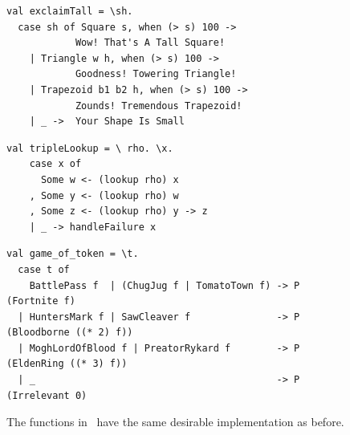\documentclass[article,screen,12pt, nonacm]{acmart}
\begin{document}
    \begin{figure}[ht] 
      \begin{minipage}[h]{0.54\linewidth}
        \pplst 
        \begin{lstlisting}[numbers=none, basicstyle=\tiny, xleftmargin=.2em,
          showstringspaces=false,
          frame=single]
val exclaimTall = \sh.
  case sh of Square s, when (> s) 100 -> 
            Wow! That's A Tall Square!  
    | Triangle w h, when (> s) 100 ->
            Goodness! Towering Triangle!
    | Trapezoid b1 b2 h, when (> s) 100 -> 
            Zounds! Tremendous Trapezoid!
    | _ ->  Your Shape Is Small
  \end{lstlisting}
          \label{fig:ppexclaimtall} 
      \end{minipage}%
      \begin{minipage}[h]{0.5\linewidth}
        \pplst 
        \begin{lstlisting}[numbers=none, basicstyle=\tiny, xleftmargin=2em,
                      frame=single]
  val tripleLookup = \ rho. \x.
    case x of 
      Some w <- (lookup rho) x
    , Some y <- (lookup rho) w
    , Some z <- (lookup rho) y -> z
    | _ -> handleFailure x

   \end{lstlisting}
            \label{fig:pptriplelookup} 
        \vspace{4ex}
      \end{minipage} 
      \begin{minipage}[h]{\linewidth}
        \pplst 
        \begin{lstlisting}[numbers=none, basicstyle=\tiny, xleftmargin=9em,
          showstringspaces=false,
          frame=single]
val game_of_token = \t. 
  case t of  
    BattlePass f  | (ChugJug f | TomatoTown f) -> P (Fortnite f)
  | HuntersMark f | SawCleaver f               -> P (Bloodborne ((* 2) f))
  | MoghLordOfBlood f | PreatorRykard f        -> P (EldenRing ((* 3) f))
  | _                                          -> P (Irrelevant 0)
\end{lstlisting}
          \label{fig:ppgot}
      \vspace{4ex}
      \end{minipage}%
      \caption{The functions in \PPlus\ have the same desirable implementation
      as before.}
  \label{fig:ppfuncs}
    \end{figure}        
    
\end{document}
